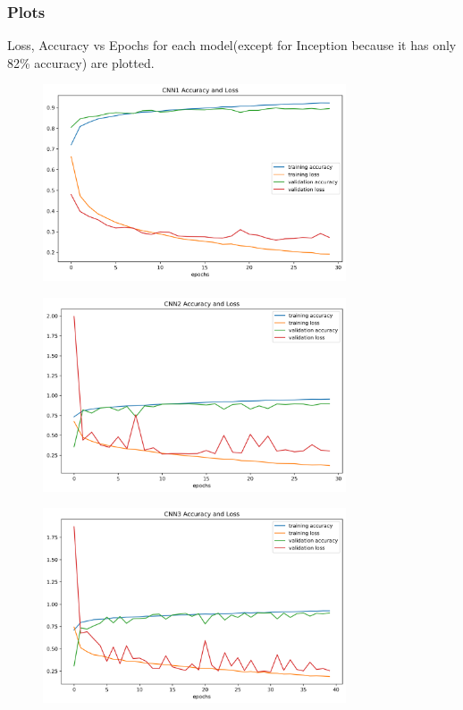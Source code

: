 \documentclass[12pt]{article}
\begin{document}
\subsubsection{Plots}
Loss, Accuracy vs Epochs for each model(except for Inception because it has only 82\% accuracy) are plotted.
\begin{figure}[H]
\begin{center}
    \includegraphics[width=0.8\textwidth]{./plots/CNN1_Result.png}
\end{center}
\end{figure}
\begin{figure}[H]
\begin{center}
    \includegraphics[width=0.8\textwidth]{./plots/CNN2_Result.png}
\end{center}
\end{figure}
\begin{figure}[H]
\begin{center}
    \includegraphics[width=0.8\textwidth]{./plots/CNN3_Result.png}
\end{center}
\end{figure}
\end{document}
